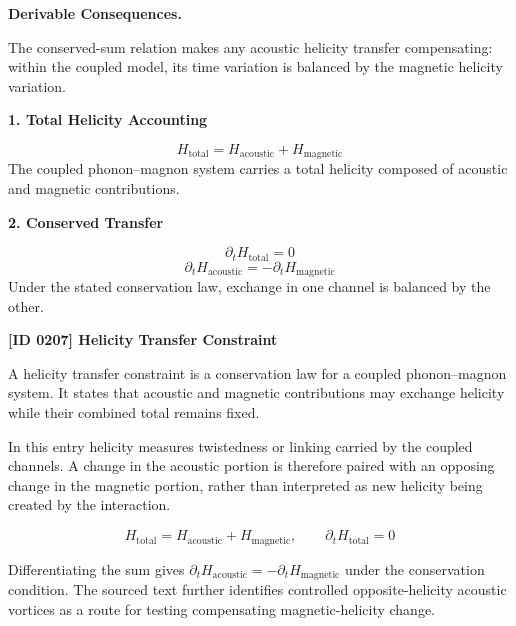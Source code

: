 \par\vspace{0.35em}
\noindent\textbf{Derivable Consequences.}\quad
\begingroup
\footnotesize
\raggedright
The conserved-sum relation makes any acoustic helicity transfer compensating: within the coupled model, its time variation is balanced by the magnetic helicity variation.
\par\endgroup

\noindent\textbf{1. Total Helicity Accounting}\par
\[
H_{\mathrm{total}} = H_{\mathrm{acoustic}} + H_{\mathrm{magnetic}}
\]
\noindent The coupled phonon--magnon system carries a total helicity composed of acoustic and magnetic contributions.\par
\noindent\textbf{2. Conserved Transfer}\par
\[
\partial_t H_{\mathrm{total}}=0
\]
\[
\partial_t H_{\mathrm{acoustic}}=-\partial_t H_{\mathrm{magnetic}}
\]
\noindent Under the stated conservation law, exchange in one channel is balanced by the other.\par

\clearpage
\noindent\textbf{[ID 0207] Helicity Transfer Constraint}\par
\vspace{0.35em}
\begingroup\small


A helicity transfer constraint is a conservation law for a coupled phonon--magnon system. It states that acoustic and magnetic contributions may exchange helicity while their combined total remains fixed.


In this entry helicity measures twistedness or linking carried by the coupled channels. A change in the acoustic portion is therefore paired with an opposing change in the magnetic portion, rather than interpreted as new helicity being created by the interaction.


\[
H_{\mathrm{total}}=H_{\mathrm{acoustic}}+H_{\mathrm{magnetic}},\qquad
\partial_t H_{\mathrm{total}}=0
\]


Differentiating the sum gives \(\partial_t H_{\mathrm{acoustic}}=-\partial_t H_{\mathrm{magnetic}}\) under the conservation condition. The sourced text further identifies controlled opposite-helicity acoustic vortices as a route for testing compensating magnetic-helicity change.

